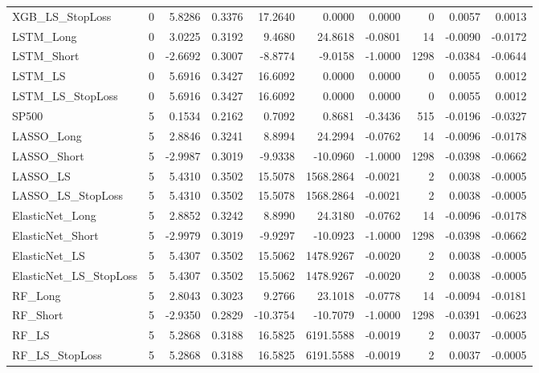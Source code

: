 \begin{tabular}{llrrrrrrrr}
\cline{1-10}
XGB\_LS\_StopLoss & 0 & 5.8286 & 0.3376 & 17.2640 & 0.0000 & 0.0000 & 0 & 0.0057 & 0.0013 \\
\cline{1-10}
LSTM\_Long & 0 & 3.0225 & 0.3192 & 9.4680 & 24.8618 & -0.0801 & 14 & -0.0090 & -0.0172 \\
\cline{1-10}
LSTM\_Short & 0 & -2.6692 & 0.3007 & -8.8774 & -9.0158 & -1.0000 & 1298 & -0.0384 & -0.0644 \\
\cline{1-10}
LSTM\_LS & 0 & 5.6916 & 0.3427 & 16.6092 & 0.0000 & 0.0000 & 0 & 0.0055 & 0.0012 \\
\cline{1-10}
LSTM\_LS\_StopLoss & 0 & 5.6916 & 0.3427 & 16.6092 & 0.0000 & 0.0000 & 0 & 0.0055 & 0.0012 \\
\cline{1-10}
SP500 & 5 & 0.1534 & 0.2162 & 0.7092 & 0.8681 & -0.3436 & 515 & -0.0196 & -0.0327 \\
\cline{1-10}
LASSO\_Long & 5 & 2.8846 & 0.3241 & 8.8994 & 24.2994 & -0.0762 & 14 & -0.0096 & -0.0178 \\
\cline{1-10}
LASSO\_Short & 5 & -2.9987 & 0.3019 & -9.9338 & -10.0960 & -1.0000 & 1298 & -0.0398 & -0.0662 \\
\cline{1-10}
LASSO\_LS & 5 & 5.4310 & 0.3502 & 15.5078 & 1568.2864 & -0.0021 & 2 & 0.0038 & -0.0005 \\
\cline{1-10}
LASSO\_LS\_StopLoss & 5 & 5.4310 & 0.3502 & 15.5078 & 1568.2864 & -0.0021 & 2 & 0.0038 & -0.0005 \\
\cline{1-10}
ElasticNet\_Long & 5 & 2.8852 & 0.3242 & 8.8990 & 24.3180 & -0.0762 & 14 & -0.0096 & -0.0178 \\
\cline{1-10}
ElasticNet\_Short & 5 & -2.9979 & 0.3019 & -9.9297 & -10.0923 & -1.0000 & 1298 & -0.0398 & -0.0662 \\
\cline{1-10}
ElasticNet\_LS & 5 & 5.4307 & 0.3502 & 15.5062 & 1478.9267 & -0.0020 & 2 & 0.0038 & -0.0005 \\
\cline{1-10}
ElasticNet\_LS\_StopLoss & 5 & 5.4307 & 0.3502 & 15.5062 & 1478.9267 & -0.0020 & 2 & 0.0038 & -0.0005 \\
\cline{1-10}
RF\_Long & 5 & 2.8043 & 0.3023 & 9.2766 & 23.1018 & -0.0778 & 14 & -0.0094 & -0.0181 \\
\cline{1-10}
RF\_Short & 5 & -2.9350 & 0.2829 & -10.3754 & -10.7079 & -1.0000 & 1298 & -0.0391 & -0.0623 \\
\cline{1-10}
RF\_LS & 5 & 5.2868 & 0.3188 & 16.5825 & 6191.5588 & -0.0019 & 2 & 0.0037 & -0.0005 \\
\cline{1-10}
RF\_LS\_StopLoss & 5 & 5.2868 & 0.3188 & 16.5825 & 6191.5588 & -0.0019 & 2 & 0.0037 & -0.0005 \\

\end{tabular}
